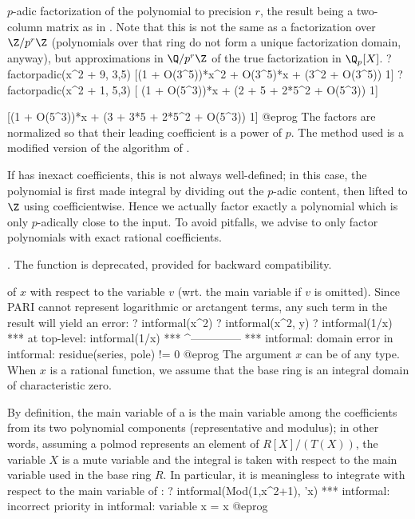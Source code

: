 \label{se:factorpadic}
$p$-adic factorization
of the polynomial  to precision $r$, the result being a
two-column matrix as in . Note that this is not the same
as a factorization over $\Z/p^r\Z$ (polynomials over that ring do not form a
unique factorization domain, anyway), but approximations in $\Q/p^r\Z$ of
the true factorization in $\Q_p[X]$.
\bprog
? factorpadic(x^2 + 9, 3,5)
[(1 + O(3^5))*x^2 + O(3^5)*x + (3^2 + O(3^5)) 1]
? factorpadic(x^2 + 1, 5,3)
[  (1 + O(5^3))*x + (2 + 5 + 2*5^2 + O(5^3)) 1]

[(1 + O(5^3))*x + (3 + 3*5 + 2*5^2 + O(5^3)) 1]
@eprog\noindent
The factors are normalized so that their leading coefficient is a power of
$p$. The method used is a modified version of the  algorithm of
.

If  has inexact  coefficients, this is not always
well-defined; in this case, the polynomial is first made integral by dividing
out the $p$-adic content,  then lifted to $\Z$ using 
coefficientwise.
Hence we actually factor exactly a polynomial which is only $p$-adically
close to the input. To avoid pitfalls, we advise to only factor polynomials
with exact rational coefficients.

 . The function  is
deprecated, provided for backward compatibility.

\label{se:intformal}
 of $x$ with respect to the variable $v$ (wrt.
the main variable if $v$ is omitted). Since PARI cannot represent
logarithmic or arctangent terms, any such term in the result will yield an
error:
\bprog
 ? intformal(x^2)
 ? intformal(x^2, y)
 ? intformal(1/x)
   ***   at top-level: intformal(1/x)
   ***                 ^--------------
   *** intformal: domain error in intformal: residue(series, pole) != 0
@eprog
The argument $x$ can be of any type. When $x$ is a rational function, we
assume that the base ring is an integral domain of characteristic zero.

  By  definition,   the main variable of a  is the main variable
among the  coefficients  from  its  two  polynomial  components
(representative and modulus); in other words, assuming a polmod represents an
element of $R[X]/(T(X))$, the variable $X$ is a mute variable and the
integral is taken with respect to the main variable used in the base ring $R$.
In particular, it is meaningless to integrate with respect to the main
variable of :
\bprog
? intformal(Mod(1,x^2+1), 'x)
*** intformal: incorrect priority in intformal: variable x = x
@eprog

